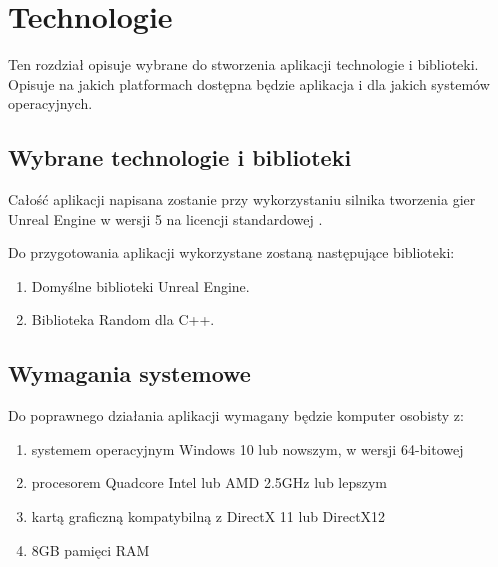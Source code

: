 \chapter{Technologie}

Ten rozdział opisuje wybrane do stworzenia aplikacji technologie i biblioteki. Opisuje na jakich platformach dostępna będzie aplikacja i dla jakich systemów operacyjnych.

\section{Wybrane technologie i biblioteki}

Całość aplikacji napisana zostanie przy wykorzystaniu silnika tworzenia gier Unreal Engine w wersji 5 na licencji standardowej \cite{licence}.

Do przygotowania aplikacji wykorzystane zostaną następujące biblioteki:

\begin{enumerate}
    \item Domyślne biblioteki Unreal Engine.
    \item Biblioteka Random dla C++.
\end{enumerate}

\section{Wymagania systemowe}

Do poprawnego działania aplikacji wymagany będzie komputer osobisty z:

\begin{enumerate}
    \item systemem operacyjnym Windows 10 lub nowszym, w wersji 64-bitowej
    \item procesorem Quadcore Intel lub AMD 2.5GHz lub lepszym
    \item kartą graficzną kompatybilną z DirectX 11 lub DirectX12
    \item 8GB pamięci RAM
\end{enumerate}